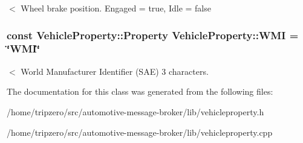 $<$ Wheel brake position. Engaged = true, Idle = false \hypertarget{classVehicleProperty_a32f980d900d97cf94171ea9fa25408e0}{
\subsubsection[{W\-M\-I}]{\setlength{\rightskip}{0pt plus 5cm}const Vehicle\-Property\-::\-Property Vehicle\-Property\-::\-W\-M\-I = \char`\"{}W\-M\-I\char`\"{}\hspace{0.3cm}{\ttfamily [static]}}}\label{classVehicleProperty_a32f980d900d97cf94171ea9fa25408e0}
$<$ World Manufacturer Identifier (S\-A\-E) 3 characters. 

The documentation for this class was generated from the following files\-:\begin{DoxyCompactItemize}
\item 
/home/tripzero/src/automotive-\/message-\/broker/lib/vehicleproperty.\-h\item 
/home/tripzero/src/automotive-\/message-\/broker/lib/vehicleproperty.\-cpp\end{DoxyCompactItemize}
